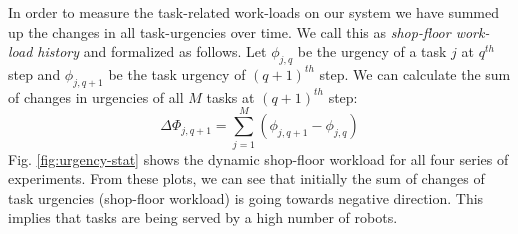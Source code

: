 \documentclass[journal]{IEEEtran}
\begin{document}
In order to measure the task-related work-loads on our system we have summed up the changes in all task-urgencies over time. We call this as {\em shop-floor work-load history} and formalized as follows. Let $ \phi_{j, q}$ be the urgency of a task $j$ at $q^{th}$ step and $\phi_{j, q+1}$ be the task urgency of $(q+1)^{th}$ step. We can calculate the sum of changes in urgencies of all $M$ tasks at $(q+1)^{th}$ step:
\begin{equation} 
\Delta \Phi_{j, q+1} = \sum_{j=1}^{M} (\phi_{j, q+1} - \phi_{j, q})
\label{eqn:Delta-Phi}
\end{equation}
Fig. \ref{fig:urgency-stat} shows the dynamic shop-floor workload for all four series of experiments. From these plots, we can see that initially the sum of changes of task urgencies (shop-floor workload) is going towards negative direction. This implies that tasks are being served by a high number of robots. 
\end{document}
